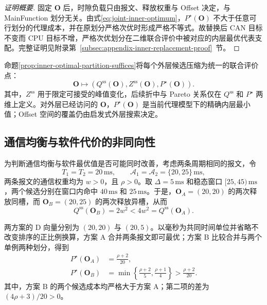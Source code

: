 \documentclass[UTF8,a4paper,twoside,zihao=-4]{ctexart}
\numberwithin{equation}{section}
\numberwithin{figure}{section}
\numberwithin{table}{section}
\theoremstyle{definition}
\newcommand{\Oset}{\mathcal{A}}
\numberwithin{algocf}{section}
\begin{document}
\begin{proof}[证明概要]
固定 $\boldsymbol O$ 后，时隙负载只由报文、释放权重与 Offset 决定，与 MainFunction 划分无关。由式\eqref{eq:joint-inner-optimum}，$P^\star(\boldsymbol O)$ 不大于任意可行划分的代理成本，并在原划分严格次优时形成严格不等式。故替换后 CAN 目标不变而 CPU 目标不增，严格次优划分在二维联合评价中被对应的内层最优代表支配。完整证明见附录第~\ref{subsec:appendix-inner-replacement-proof}~节。
\end{proof}

命题\ref{prop:inner-optimal-partition-suffices}将每个外层候选压缩为统一的联合评价点：
\begin{equation}
 \boldsymbol O
 \longmapsto
 \left(
 Q^{\mathrm{ss}}(\boldsymbol O),
 Z^{\mathrm{ss}}(\boldsymbol O),
 P^\star(\boldsymbol O)
 \right).
\label{eq:joint-evaluation-map}
\end{equation}
其中，$Z^{\mathrm{ss}}$ 用于限定可接受的峰值变化，后续折中与 Pareto 关系仅在 $Q^{\mathrm{ss}}$ 和 $P^\star$ 两维上定义。对外层已经访问的 $\boldsymbol O$，$P^\star(\boldsymbol O)$ 是当前代理模型下的精确内层最小值；Offset 空间的覆盖仍由启发式外层搜索决定。

\subsection{通信均衡与软件代价的非同向性}
\label{subsec:joint-strict-conflict}

为判断通信均衡与软件最优值是否可能同时改善，考虑两条周期相同的报文，令
\begin{equation}
 T_1=T_2=20\,\mathrm{ms},
 \qquad
 \Oset_1=\Oset_2=\{20,25\}\,\mathrm{ms},
\label{eq:two-message-conflict-instance}
\end{equation}
两条报文的通信权重均为 $w>0$，且 $\rho>0$。取 $\Delta=5\,\mathrm{ms}$ 和稳态窗口 $[25,45)\,\mathrm{ms}$，两个候选分别在窗口内命中 $40\,\mathrm{ms}$ 和 $25\,\mathrm{ms}$。于是，$\boldsymbol O_A=(20,20)$ 的两次释放同槽，而 $\boldsymbol O_B=(20,25)$ 的两次释放异槽，从而
\begin{equation}
 Q^{\mathrm{ss}}(\boldsymbol O_B)=2w^2
 <4w^2=Q^{\mathrm{ss}}(\boldsymbol O_A).
\label{eq:two-message-q-conflict}
\end{equation}

两方案的 D 向量分别为 $(20,20)$ 与 $(20,5)$。以毫秒为共同时间单位并省略不改变排序的正比例换算，方案 A 合并两条报文即可最优；方案 B 比较合并与两个单例两种划分，得到
\begin{equation}
 \begin{aligned}
  P^\star(\boldsymbol O_A)
  &=\frac{\rho+2}{20},\\
  P^\star(\boldsymbol O_B)
  &=\min\!\left\{
    \frac{\rho+2}{5},\frac{\rho+1}{4}
   \right\}
  >\frac{\rho+2}{20}.
 \end{aligned}
\label{eq:two-message-pstar-conflict}
\end{equation}
其中，方案 B 的两个候选成本均严格大于方案 A；第二项的差为 $(4\rho+3)/20>0$。
\end{document}
